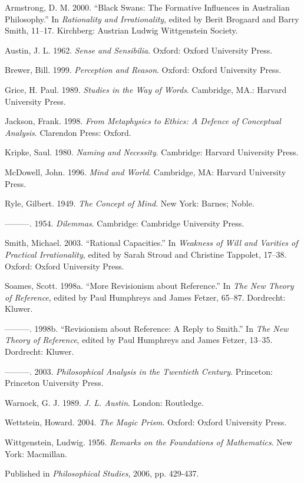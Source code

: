 \documentclass[
  10pt,
  letterpaper,
  DIV=11,
  numbers=noendperiod,
  twoside]{scrartcl}
\newlength{\cslhangindent}
\newenvironment{CSLReferences}[2] %
 {\begin{list}{}{%
  \setlength{\itemindent}{0pt}
  \setlength{\leftmargin}{0pt}
  \setlength{\parsep}{0pt}
  \ifodd #1
   \setlength{\leftmargin}{\cslhangindent}
   \setlength{\itemindent}{-1\cslhangindent}
  \fi
  \setlength{\itemsep}{#2\baselineskip}}}
 {\end{list}}
\begin{document}
\label{refs}
\begin{CSLReferences}{1}{0}
Armstrong, D. M. 2000. {``Black Swans: The Formative Influences in
Australian Philosophy.''} In \emph{Rationality and Irrationality},
edited by Berit Brogaard and Barry Smith, 11--17. Kirchberg: Austrian
Ludwig Wittgenstein Society.

Austin, J. L. 1962. \emph{Sense and Sensibilia}. Oxford: Oxford
University Press.

Brewer, Bill. 1999. \emph{Perception and Reason}. Oxford: Oxford
University Press.

Grice, H. Paul. 1989. \emph{Studies in the Way of Words}. Cambridge,
MA.: Harvard University Press.

Jackson, Frank. 1998. \emph{From Metaphysics to Ethics: A Defence of
Conceptual Analysis}. Clarendon Press: Oxford.

Kripke, Saul. 1980. \emph{Naming and Necessity}. Cambridge: Harvard
University Press.

McDowell, John. 1996. \emph{Mind and World}. Cambridge, MA: Harvard
University Press.

Ryle, Gilbert. 1949. \emph{The Concept of Mind}. New York: Barnes;
Noble.

---------. 1954. \emph{Dilemmas}. Cambridge: Cambridge University Press.

Smith, Michael. 2003. {``Rational Capacities.''} In \emph{Weakness of
Will and Varities of Practical Irrationality}, edited by Sarah Stroud
and Christine Tappolet, 17--38. Oxford: Oxford University Press.

Soames, Scott. 1998a. {``More Revisionism about Reference.''} In
\emph{The New Theory of Reference}, edited by Paul Humphreys and James
Fetzer, 65--87. Dordrecht: Kluwer.

---------. 1998b. {``Revisionism about Reference: A Reply to Smith.''}
In \emph{The New Theory of Reference}, edited by Paul Humphreys and
James Fetzer, 13--35. Dordrecht: Kluwer.

---------. 2003. \emph{Philosophical Analysis in the Twentieth Century}.
Princeton: Princeton University Press.

Warnock, G. J. 1989. \emph{J. L. Austin}. London: Routledge.

Wettstein, Howard. 2004. \emph{The Magic Prism}. Oxford: Oxford
University Press.

Wittgenstein, Ludwig. 1956. \emph{Remarks on the Foundations of
Mathematics}. New York: Macmillan.

\end{CSLReferences}



\noindent Published in\emph{
Philosophical Studies}, 2006, pp. 429-437.
\end{document}
